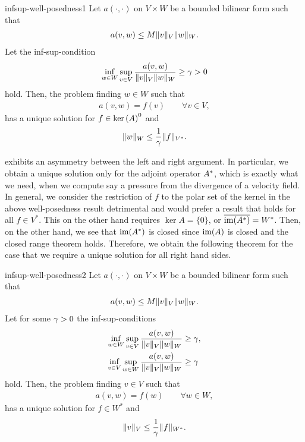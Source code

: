 \begin{Corollary}{infsup-well-posedness1}
  Let $a(\cdot,\cdot)$ on $V\times W$ be a bounded bilinear form such that
  \begin{gather}
    a(v,w) \le M \lVert v\rVert_V \lVert w\rVert_W.
  \end{gather}
  Let the inf-sup-condition
  \begin{gather}
    \inf_{w\in W}\sup_{v\in V}
    \frac{a(v,w)}{\lVert v\rVert_V\lVert w\rVert_W}
    \ge \gamma > 0
  \end{gather}
  hold.  Then, the problem finding $w\in W$ such that
  \begin{gather}
    a(v,w) = f(v) \qquad\forall v\in V,
  \end{gather}
  has a unique solution for $f\in \operatorname{ker}\left(A\right)^0$ and
  \begin{gather}
    \lVert w\rVert_W \le \frac1{\gamma} \lVert f\rVert_{V^*}.
  \end{gather}
\end{Corollary}

\begin{remark}
   exhibits an asymmetry
  between the left and right argument. In particular, we obtain a
  unique solution only for the adjoint operator $A^*$, which is
  exactly what we need, when we compute say a pressure from the
  divergence of a velocity field. In general, we consider the
  restriction of $f$ to the polar set of the kernel in the above
  well-posedness result detrimental and would prefer a result that
  holds for all $f\in V^*$. This on the other hand requires
  $\ker A=\{0\}$, or $\overline{\operatorname{im}(A^*)} = W^*$. Then, on the
  other hand, we see that $\operatorname{im}(A^*)$ is closed since $\operatorname{im}(A)$ is
  closed and the closed range theorem holds. Therefore, we obtain the
  following theorem for the case that we require a unique solution for
  all right hand sides.
\end{remark}

\begin{Theorem}{infsup-well-posedness2}
  Let $a(\cdot,\cdot)$ on $V\times W$ be a bounded bilinear form such that
  \begin{gather}
    a(v,w) \le M \lVert v\rVert_V \lVert w\rVert_W.
  \end{gather}
  Let for some $\gamma>0$ the inf-sup-conditions
  \begin{align}
    \inf_{w\in W}\sup_{v\in V}
    \frac{a(v,w)}{\lVert v\rVert_V\lVert w\rVert_W}
    &\ge \gamma,\\
    \inf_{v\in V}\sup_{w\in W}
    \frac{a(v,w)}{\lVert v\rVert_V\lVert w\rVert_W}
    &\ge \gamma
  \end{align}
  hold.  Then, the problem finding $v\in V$ such that
  \begin{gather}
    a(v,w) = f(w) \qquad\forall w\in W,
  \end{gather}
  has a unique solution for $f\in W^*$ and
  \begin{gather}
    \lVert v\rVert_V \le \frac1{\gamma} \lVert f\rVert_{W^*}.
  \end{gather}
\end{Theorem}

